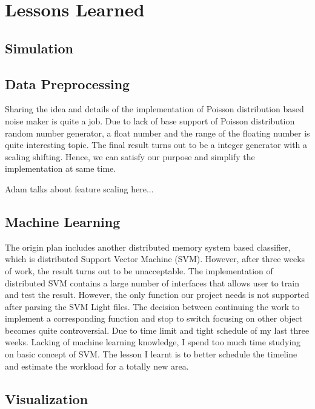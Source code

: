 \section{Lessons Learned}
\label{lessons}

\subsection{Simulation}


\subsection{Data Preprocessing}

Sharing the idea and details of the implementation of Poisson distribution based noise maker is quite a job. Due to lack of base support of Poisson distribution random number generator, a float number and the range of the floating number is quite interesting topic. The final result turns out to be a integer generator with a scaling shifting. Hence, we can satisfy our purpose and simplify the implementation at same time.

Adam talks about feature scaling here...

\subsection{Machine Learning}

The origin plan includes another distributed memory system based classifier, which is distributed Support Vector Machine (SVM). However, after three weeks of work, the result turns out to be unacceptable. The implementation of distributed SVM contains a large number of interfaces that allows user to train and test the result. However, the only function our project needs is not supported after parsing the SVM Light files. The decision between continuing the work to implement a corresponding function and stop to switch focusing on other object becomes quite controversial. Due to time limit and tight schedule of my last three weeks. Lacking of machine learning knowledge, I spend too much time studying on basic concept of SVM. The lesson I learnt is to better schedule the timeline and estimate the workload for a totally new area.



\subsection{Visualization}